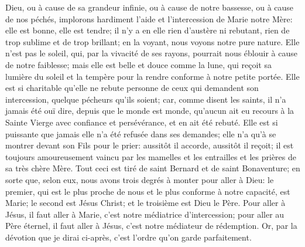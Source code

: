 Dieu, ou à cause de sa grandeur infinie, ou à cause de notre bassesse, ou à cause de nos péchés, implorons
hardiment l'aide et l'intercession de Marie notre Mère: elle est bonne, elle est tendre; il n'y a en elle rien d'austère
ni rebutant, rien de trop sublime et de trop brillant; en la voyant, nous voyons notre pure nature. Elle n'est pas le
soleil, qui, par la vivacité de ses rayons, pourrait nous éblouir à cause de notre faiblesse; mais elle est belle et
douce comme la lune, qui reçoit sa lumière du soleil et la tempère pour la rendre conforme à notre petite portée.
Elle est si charitable qu'elle ne rebute personne de ceux qui demandent son intercession, quelque pécheurs qu'ils
soient; car, comme disent les saints, il n'a jamais été ouï dire, depuis que le monde est monde, qu'aucun ait eu
recours à la Sainte Vierge avec confiance et persévérance, et en ait été rebuté. Elle est si puissante que jamais
elle n'a été refusée dans ses demandes; elle n'a qu'à se montrer devant son Fils pour le prier: aussitôt il accorde,
aussitôt il reçoit; il est toujours amoureusement vaincu par les mamelles et les entrailles et les prières de sa très
chère Mère.
 Tout ceci est tiré de saint Bernard et de saint Bonaventure; en sorte que, selon eux, nous avons trois degrés à
monter pour aller à Dieu: le premier, qui est le plus proche de nous et le plus conforme à notre capacité, est Marie;
le second est Jésus Christ; et le troisième est Dieu le Père. Pour aller à Jésus, il faut aller à Marie, c'est notre
médiatrice d'intercession; pour aller au Père éternel, il faut aller à Jésus, c'est notre médiateur de rédemption. Or,
par la dévotion que je dirai ci-après, c'est l'ordre qu'on garde parfaitement.
